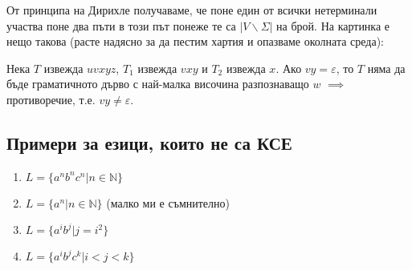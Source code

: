 \documentclass[fleqn,12pt]{article}
\begin{document}
\begin{flushleft}
От принципа на Дирихле получаваме, че поне един от всички нетерминали участва поне два пъти в този път понеже те са $|V \backslash \Sigma|$ на брой. На картинка е нещо такова (расте надясно за да пестим хартия и опазваме околната среда):

\begin{center}
\end{center}


Нека $T$ извежда $uvxyz$, $T_1$ извежда $vxy$ и $T_2$ извежда $x$. Ако $vy = \varepsilon$, то $T$ няма да бъде граматичното дърво с най-малка височина разпознаващо $w$ $\implies$ противоречие, т.е. $vy \neq \varepsilon$.

\begin{center}
\end{center}

\begin{center}
\end{center}

\subsection{Примери за езици, които не са КСЕ}

\begin{enumerate}
    \item $L = \{a^nb^nc^n | n \in \mathbb{N} \}$
    \item $L = \{a^n | n \in \mathbb{N}\}$ (малко ми е съмнително)
    \item $L = \{a^ib^j | j = i^2\}$
    \item $L = \{a^ib^jc^k | i < j < k\}$
\end{enumerate}


\end{flushleft}
\end{document}
